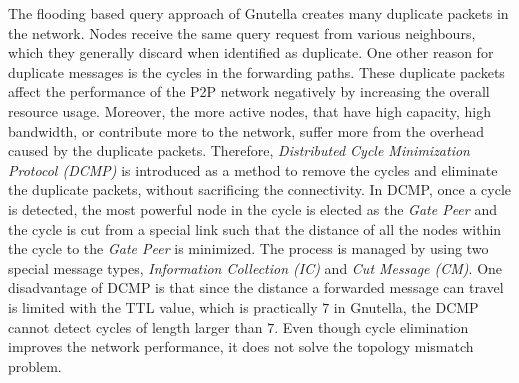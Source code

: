 \documentclass[acmcsur]{acmtrans2m}
\begin{document}
The flooding based query approach of Gnutella creates many duplicate packets in
the network. Nodes receive the same query request from various neighbours, which
they generally discard when identified as duplicate. One other reason for
duplicate messages is the cycles in the forwarding paths. These duplicate
packets affect the performance of the P2P network negatively by increasing the
overall resource usage. Moreover, the more active nodes, that have high
capacity, high bandwidth, or contribute more to the network, suffer more from
the overhead caused by the duplicate packets. Therefore, \emph{Distributed Cycle
Minimization Protocol (DCMP)} \cite{zhu_dcmp_2008} is introduced as a method to
remove the cycles and eliminate the duplicate packets, without sacrificing the
connectivity. In DCMP, once a cycle is detected, the most powerful node in the
cycle is elected as the \emph{Gate Peer} and the cycle is cut from a special
link such that the distance of all the nodes within the cycle to the \emph{Gate
Peer} is minimized. The process is managed by using two special message types,
\emph{Information Collection (IC)} and \emph{Cut Message (CM)}. One disadvantage
of DCMP is that since the distance a forwarded message can travel is limited
with the TTL value, which is practically $7$ in Gnutella, the DCMP cannot detect
cycles of length larger than $7$. Even though cycle elimination improves the
network performance, it does not solve the topology mismatch problem.


%
%
\end{document}
